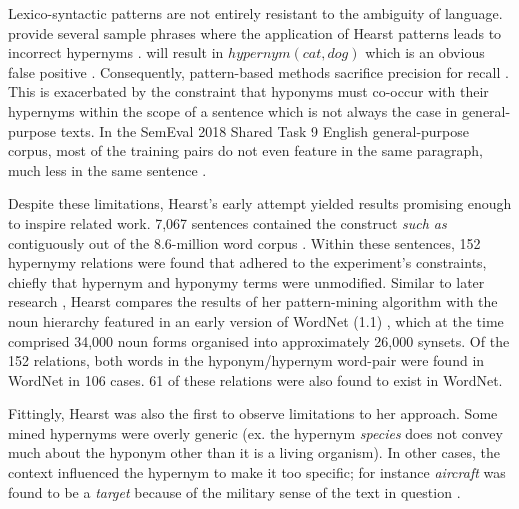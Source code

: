 Lexico-syntactic patterns are not entirely resistant to the ambiguity of language.  \citeauthor{wu2012probase} provide several sample phrases where the application of Hearst patterns leads to incorrect hypernyms \citep{wu2012probase}.   will result in \(hypernym(cat, dog)\) which is an obvious false positive \citep{wu2012probase}.  Consequently, pattern-based methods sacrifice precision for recall \citep{Wang2017, Snow2004, ritter2009anyway}.  This is exacerbated by the constraint that hyponyms must co-occur with their hypernyms within the scope of a sentence which is not always the case in general-purpose texts.  In the SemEval 2018 Shared Task 9 \citep{camacho2018semeval} English general-purpose corpus, most of the training pairs do not even feature in the same paragraph, much less in the same sentence \citep{bernier2018crim}.


Despite these limitations, Hearst’s early attempt yielded results promising enough to inspire related work.  7,067 sentences contained the construct \textit{such as} contiguously out of the 8.6-million word corpus \citep{grolier1990academic}.  Within these sentences, 152 hypernymy relations were found that adhered to the experiment’s constraints, chiefly that hypernym and hyponymy terms were unmodified.  Similar to later research \citep{kozareva2010semi}, Hearst compares the results of her pattern-mining algorithm with the noun hierarchy featured in an early version of WordNet (1.1) \citep{Miller1995}, which at the time comprised 34,000 noun forms organised into approximately 26,000 \ac{synset}s.  Of the 152 relations, both words in the hyponym/hypernym word-pair were found in WordNet in 106 cases.  61 of these relations were also found to exist in WordNet.  

Fittingly, Hearst was also the first to observe limitations to her approach.  Some mined hypernyms were overly generic (ex. the hypernym \textit{species} does not convey much about the hyponym other than it is a living organism).  In other cases, the context influenced the hypernym to make it too specific; for instance \textit{aircraft} was found to be a \textit{target} because of the military sense of the text in question \citep{hearst1992automatic}.

